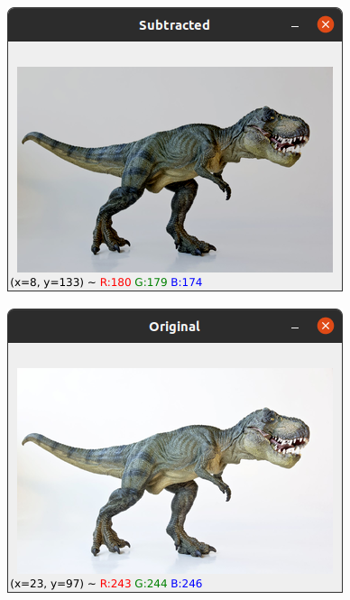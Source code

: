 \documentclass[12pt,letterpaper]{article}
\begin{document}
\begin{multicols}{2}
\begin{figure}[H]
\centering
\includegraphics[width = \columnwidth]{Resultado2_ch6_1.png}
\end{figure}

\begin{figure}[H]
\centering
\includegraphics[width = \columnwidth]{Resultado3_ch6_1.png}
\end{figure}


\end{multicols}
\end{document}
